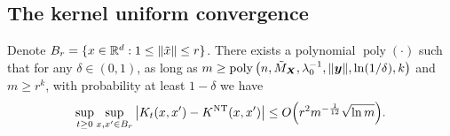 
\subsection{The kernel uniform convergence} \label{subsec:KernelUniformConvergence}



\begin{proposition}
  \label{prop:2_KernelUniform}
  Denote $B_r = \{x\in \mathbb{R}^{d}: 1 \leq \norm{\tilde{x}} \leq r\}$.
  There exists a polynomial $\operatorname{poly}(\cdot)$ such that
  for any $\delta \in (0,1)$,
  as long as $m \geq \mathrm{poly}\left(n, \tilde{M}_{\bm{X}}, \lambda_0^{-1},\norm{\bm{y}},\ln(1/\delta),k\right)$ and $m \geq r^k$,
  with probability at least $1-\delta$ we have
  \begin{equation*}
    \sup_{t \geq 0} \sup_{\x,\x'\in B_r}\abs{K_t(\x,\x') - \NTK(\x,\x')} \leq O\xkm{ r^2 m^{-\frac{1}{12}}\sqrt{\ln m}}.
  \end{equation*}
\end{proposition}


